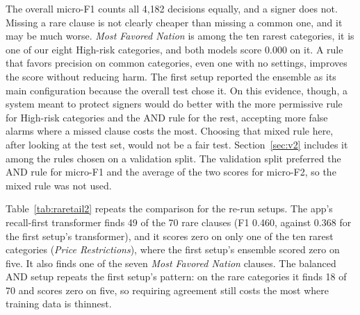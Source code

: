 The overall micro-F1 counts all 4{,}182 decisions equally, and a signer does not. Missing a rare clause is not clearly cheaper than missing a common one, and it may be much worse. \emph{Most Favored Nation} is among the ten rarest categories, it is one of our eight High-risk categories, and both models score 0.000 on it. A rule that favors precision on common categories, even one with no settings, improves the score without reducing harm. The first setup reported the ensemble as its main configuration because the overall test chose it. On this evidence, though, a system meant to protect signers would do better with the more permissive rule for High-risk categories and the AND rule for the rest, accepting more false alarms where a missed clause costs the most. Choosing that mixed rule here, after looking at the test set, would not be a fair test. Section~\ref{sec:v2} includes it among the rules chosen on a validation split. The validation split preferred the AND rule for micro-F1 and the average of the two scores for micro-F2, so the mixed rule was not used.

Table~\ref{tab:raretail2} repeats the comparison for the re-run setups. The app's recall-first transformer finds 49 of the 70 rare clauses (F1 0.460, against 0.368 for the first setup's transformer), and it scores zero on only one of the ten rarest categories (\emph{Price Restrictions}), where the first setup's ensemble scored zero on five. It also finds one of the seven \emph{Most Favored Nation} clauses. The balanced AND setup repeats the first setup's pattern: on the rare categories it finds 18 of 70 and scores zero on five, so requiring agreement still costs the most where training data is thinnest.

